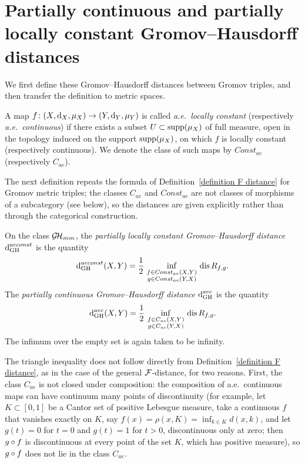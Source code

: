 \section{\protect\sloppy Partially continuous and partially locally constant Gromov--Hausdorff distances}\label{sec: partially smooth}

  We first define these Gromov--Hausdorff distances between Gromov triples, and then transfer the definition to metric spaces.
  \begin{define}
    A map $f \colon (X, \operatorname{d}_{X}, \mu_{X}) \to (Y, \operatorname{d}_{Y}, \mu_{Y})$ is called \emph{a.e.\ locally constant} (respectively \emph{a.e.\ continuous}) if there exists a subset $U \subset \operatorname{supp}(\mu_X)$ of full measure, open in the topology induced on the support $\operatorname{supp}(\mu_X)$, on which $f$ is locally constant (respectively continuous).
    We denote the class of such maps by $Const_{ae}$ (respectively $C_{ae}$).
  \end{define}
  The next definition repeats the formula of Definition~\ref{definition F distance} for Gromov metric triples; the classes $C_{ae}$ and $Const_{ae}$ are not classes of morphisms of a subcategory (see below), so the distances are given explicitly rather than through the categorical construction.
  \begin{define}
    On the class $\operatorname{\mathcal{G\!H}}_{mm}$, the \emph{partially locally constant Gromov--Hausdorff distance} $\operatorname{d}^{aeconst}_{\mathrm{GH}}$ is the quantity
    $$
    \operatorname{d}^{aeconst}_{\mathrm{GH}}(X,Y)=\frac12\,\inf_{\substack{f\in Const_{ae}(X,Y)\\ g\in Const_{ae}(Y,X)}}\,\operatorname{dis} R_{f,g}.
    $$
    The \emph{partially continuous Gromov--Hausdorff distance} $\operatorname{d}^{aec}_{\mathrm{GH}}$ is the quantity
    $$
    \operatorname{d}^{aec}_{\mathrm{GH}}(X,Y)=\frac12\,\inf_{\substack{f\in C_{ae}(X,Y)\\ g\in C_{ae}(Y,X)}}\,\operatorname{dis} R_{f,g}.
    $$
    The infimum over the empty set is again taken to be infinity.
  \end{define}
  The triangle inequality does not follow directly from Definition~\ref{definition F distance}, as in the case of the general $\mathcal{F}$-distance, for two reasons. First, the class $C_{ae}$ is not closed under composition: the composition of a.e.\ continuous maps can have continuum many points of discontinuity (for example, let $K \subset [0,1]$ be a Cantor set of positive Lebesgue measure, take a continuous $f$ that vanishes exactly on $K$, say $f(x) = \rho(x, K) = \inf_{k \in K} d(x,k)$, and let $g(t) = 0$ for $t = 0$ and $g(t) = 1$ for $t > 0$, discontinuous only at zero; then $g \circ f$ is discontinuous at every point of the set $K$, which has positive measure), so $g \circ f$ does not lie in the class $C_{ae}$.

